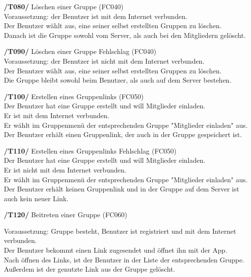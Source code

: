 \textbf{/T080/} Löschen einer Gruppe (FC040)\\
Voraussetzung: der Benutzer ist mit dem Internet verbunden.                     \\
Der Benutzer wählt aus, eine seiner selbst erstellten Gruppen zu löschen.        \\
Danach ist die Gruppe sowohl vom Server, als auch bei den Mitgliedern gelöscht.   \\
\begin{itemize}

\textbf{/T090/} Löschen einer Gruppe Fehlschlag (FC040)\\
Voraussetzung: der Benutzer ist nicht mit dem Internet verbunden.                 \\
Der Benutzer wählt aus, eine seiner selbst erstellten Gruppen zu löschen.          \\
Die Gruppe bleibt sowohl beim Benutzer, als auch auf dem Server bestehen.           \\
\begin{itemize}

\textbf{/T100/} Erstellen eines Gruppenlinks (FC050)\\
Der Benutzer hat eine Gruppe erstellt und will Mitglieder einladen.      \\
Er ist mit dem Internet verbunden.                                        \\
Er wählt im Gruppenmenü der entsprechenden Gruppe "Mitglieder einladen" aus. \\
Der Benutzer erhält einen Gruppenlink, der auch in der Gruppe gespeichert ist.\\
\begin{itemize}

\textbf{/T110/} Erstellen eines Gruppenlinks Fehlschlag (FC050)\\
Der Benutzer hat eine Gruppe erstellt und will Mitglieder einladen.            \\
Er ist nicht mit dem Internet verbunden.                                        \\
Er wählt im Gruppenmenü der entsprechenden Gruppe "Mitglieder einladen" aus.     \\
Der Benutzer erhält keinen Gruppenlink und in der Gruppe auf dem Server ist auch kein neuer Link.\\
\begin{itemize}

\textbf{/T120/} Beitreten einer Gruppe (FC060)\\
\begin{itemize}
Voraussetzung: Gruppe besteht, Benutzer ist registriert und mit dem Internet verbunden. \\
Der Benutzer bekommt einen Link zugesendet und öffnet ihn mit der App.                   \\
Nach öffnen des Links, ist der Benutzer in der Liste der entsprechenden Gruppe.           \\
Außerdem ist der genutzte Link aus der Gruppe gelöscht.                                    \\
\end{itemize}


\end{itemize}
\end{itemize}
\end{itemize}
\end{itemize}
